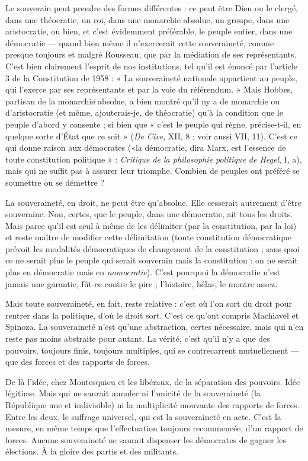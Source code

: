 Le souverain peut prendre des formes différentes : ce peut être Dieu ou le
clergé, dans une théocratie, un roi, dans une monarchie absolue, un groupe,
dans une aristocratie, ou bien, et c’est évidemment préférable, le peuple
entier, dans une démocratie — quand bien même il n’exercerait cette souveraineté,
comme presque toujours et malgré Rousseau, que par la médiation
de ses représentants. C’est bien clairement l'esprit de nos institutions, tel
qu’il est énoncé par l’article 3 de la Constitution de 1958 : « La souveraineté
nationale appartient au peuple, qui l’exerce par ses représentants et par la voie
du référendum. » Mais Hobbes, partisan de la monarchie absolue, a bien
montré qu'il ny a de monarchie ou d’aristocratie (et même, ajouterais-je, de
théocratie) qu’à la condition que le peuple d’abord y consente ; si bien que
« c’est le peuple qui règne, précise-t-il, en quelque sorte d’État que ce soit »
({\it De Cive}, XII, 8 ; voir aussi VII, 11). C’est ce qui donne raison aux démocrates
(«la démocratie, dira Marx, est l'essence de toute constitution
politique » : {\it Critique de la philosophie politique de Hegel}, I, a), mais qui ne
suffit pas à assurer leur triomphe. Combien de peuples ont préféré se soumettre
ou se démettre ?

La souveraineté, en droit, ne peut être qu’absolue. Elle cesserait autrement
d’être souveraine. Non, certes, que le peuple, dans une démocratie, ait tous les
droits. Mais parce qu’il est seul à même de les délimiter (par la constitution, par
la loi) et reste maître de modifier cette délimitation (toute constitution démocratique
prévoit les modalités démocratiques de changement de la
constitution ; sans quoi ce ne serait plus le peuple qui serait souverain mais la
constitution : on ne serait plus en démocratie mais en {\it nomocratie}). C'est pourquoi
la démocratie n’est jamais une garantie, fût-ce contre le pire ; l’histoire,
hélas, le montre assez.

Mais toute souveraineté, en fait, reste relative : c’est où l’on sort du droit
pour rentrer dans la politique, d’où le droit sort. C'est ce qu'ont compris
Machiavel et Spinoza. La souveraineté n’est qu’une abstraction, certes nécessaire,
mais qui n’en reste pas moins abstraite pour autant. La vérité, c'est qu’il
n’y a que des pouvoirs, toujours finis, toujours multiples, qui se contrecarrent
mutuellement — que des forces et des rapports de forces.

De là l’idée, chez Montesquieu et les libéraux, de la séparation des pouvoirs.
Idée légitime. Mais qui ne saurait annuler ni l’unicité de la souveraineté
(la République une et indivisible) ni la multiplicité mouvante des rapports de
forces. Entre les deux, le suffrage universel, qui est la souveraineté en acte. C’est
la mesure, en même temps que l’effectuation toujours recommencée, d’un rapport
de forces. Aucune souveraineté ne saurait dispenser les démocrates de
gagner les élections. À la gloire des partis et des militants.

